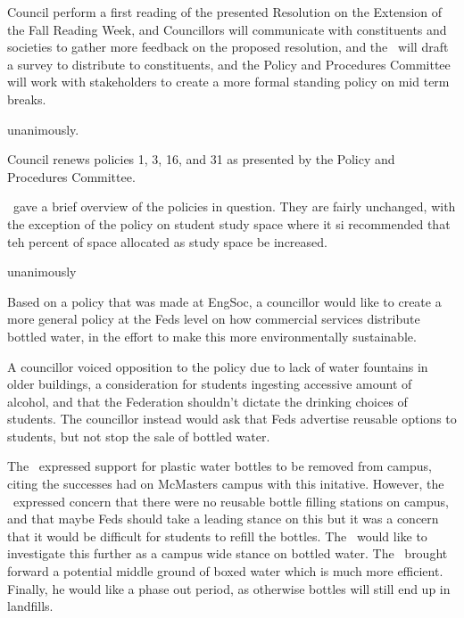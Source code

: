 \begin{motion}
\begin{information}
\end{information}

\begin{motion}

    \birt Council perform a first reading of the presented 
    Resolution on the Extension of the Fall Reading Week, and
    \bifrt Councillors will communicate with constituents and societies to
    gather more feedback on the proposed resolution, and
    \bifrt the \vpe\ will draft a survey to distribute to constituents, and
    \bifrt the Policy and Procedures Committee will work with stakeholders to 
    create a more formal standing policy on mid term breaks. 
    \mover{\seneca}{\rebecca} 

    \caries unanimously. 

\end{motion}

\begin{motion}
    \birt Council renews policies 1, 3, 16, and 31 as presented by  
    the Policy and Procedures Committee. 
    \movers{\seneca}{\brian}

    \seneca\ gave a brief overview of the policies in question. They are
    fairly unchanged, with the exception of the policy on student study
    space where it si recommended that teh percent of space allocated as 
    study space be increased. 

    \caries unanimously

\end{motion}

\begin{information}

    Based on a policy that was made at EngSoc, a councillor would like to create
    a more general policy at the Feds level on how commercial services 
    distribute bottled water, in the effort to make this more environmentally
    sustainable. 

    A councillor voiced opposition to the policy due to lack of water
    fountains in older buildings, a consideration for students 
    ingesting accessive amount of alcohol, and that the Federation shouldn't
    dictate the drinking choices of students. The councillor instead
    would ask that Feds advertise reusable options to students, but not 
    stop the sale of bottled water. 

    The \vpof\ expressed support for plastic water bottles to be removed from
    campus, citing the successes had on McMasters campus with this initative. 
    However, the \vpof\ expressed concern that there were no reusable bottle 
    filling stations on campus, and that maybe Feds should take a leading stance
    on this but it was a concern that it would be difficult for students
    to refill the bottles. The \vpof\ would like to investigate this further
    as a campus wide stance on bottled water. The \vpof\ brought 
    forward a potential middle ground of boxed water which is much more
    efficient. Finally, he would like a phase out period, as otherwise 
    bottles will still end up in landfills. 


\end{information}
\end{motion}
